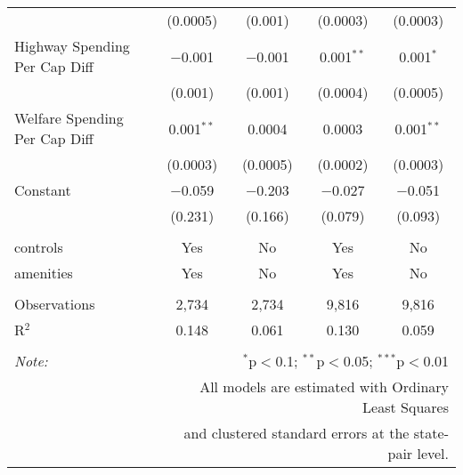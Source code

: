 \begin{table}[!htbp]
\begin{tabular}{@{\extracolsep{5pt}}lcccc}
  & (0.0005) & (0.001) & (0.0003) & (0.0003) \\ 
  Highway Spending Per Cap Diff & $-$0.001 & $-$0.001 & 0.001$^{**}$ & 0.001$^{*}$ \\ 
  & (0.001) & (0.001) & (0.0004) & (0.0005) \\ 
  Welfare Spending Per Cap Diff & 0.001$^{**}$ & 0.0004 & 0.0003 & 0.001$^{**}$ \\ 
  & (0.0003) & (0.0005) & (0.0002) & (0.0003) \\ 
  Constant & $-$0.059 & $-$0.203 & $-$0.027 & $-$0.051 \\ 
  & (0.231) & (0.166) & (0.079) & (0.093) \\ 
 \hline \\[-1.8ex] 
controls & Yes & No & Yes & No \\ 
amenities & Yes & No & Yes & No \\ 
\hline \\[-1.8ex] 
Observations & 2,734 & 2,734 & 9,816 & 9,816 \\ 
R$^{2}$ & 0.148 & 0.061 & 0.130 & 0.059 \\ 
\hline 
\hline \\[-1.8ex] 
\textit{Note:}  & \multicolumn{4}{r}{$^{*}$p$<$0.1; $^{**}$p$<$0.05; $^{***}$p$<$0.01} \\ 
 & \multicolumn{4}{r}{All models are estimated with Ordinary Least Squares} \\ 
 & \multicolumn{4}{r}{and clustered standard errors at the state-pair level.} \\ 
\end{tabular} 
\end{table} 
